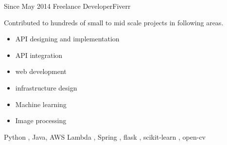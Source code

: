\begin{experiences}
  \emptySeparator
 \experience
    {Since May 2014}   {Freelance Developer}{Fiverr}{}
    {}              {
                      Contributed to hundreds of small to mid scale projects in following areas. 
                      \begin{itemize}
                      \item API designing and implementation
                      \item API integration
                      \item web development
                      \item infrastructure design
                      \item Machine learning
                      \item Image processing
                      \end{itemize}
                    }
                    {Python , Java, AWS Lambda , Spring , flask , scikit-learn , open-cv}

\end{experiences}
